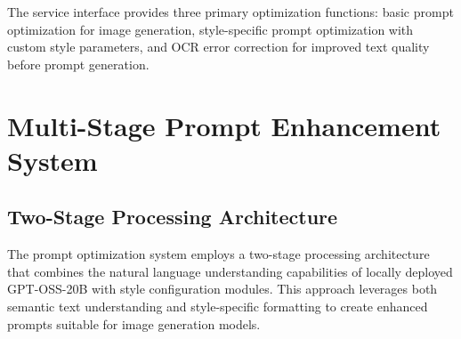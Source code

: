 The service interface provides three primary optimization functions: basic prompt optimization for image generation, style-specific prompt optimization with custom style parameters, and OCR error correction for improved text quality before prompt generation.

\section{Multi-Stage Prompt Enhancement System}

\subsection{Two-Stage Processing Architecture}

The prompt optimization system employs a two-stage processing architecture that combines the natural language understanding capabilities of locally deployed GPT-OSS-20B with style configuration modules. This approach leverages both semantic text understanding and style-specific formatting to create enhanced prompts suitable for image generation models.

